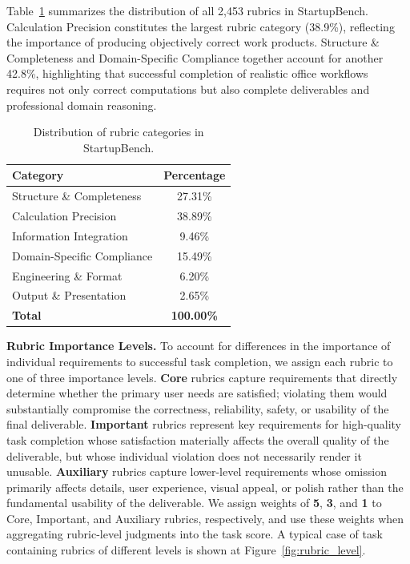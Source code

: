 Table~\ref{tab:rubric_distribution} summarizes the distribution of all 2,453 rubrics in StartupBench.  Calculation Precision constitutes the largest rubric category (38.9\%), reflecting the importance of producing objectively correct work products. Structure \& Completeness and Domain-Specific Compliance together account for another 42.8\%, highlighting that successful completion of realistic office workflows requires not only correct computations but also complete deliverables and professional domain reasoning.

\begin{table}[h]
\centering
\small
\caption{Distribution of rubric categories in StartupBench.}
\label{tab:rubric_distribution}
\begin{tabular}{lc}
\toprule
\textbf{Category} & \textbf{Percentage} \\
\midrule
Structure \& Completeness & 27.31\% \\
Calculation Precision & 38.89\% \\
Information Integration & 9.46\% \\
Domain-Specific Compliance & 15.49\% \\
Engineering \& Format & 6.20\% \\
Output \& Presentation & 2.65\% \\
\midrule
\textbf{Total} & \textbf{100.00\%} \\
\bottomrule
\end{tabular}
\end{table}



\textbf{Rubric Importance Levels.} To account for differences in the importance of individual requirements to successful task completion, we assign each rubric to one of three importance levels. \textbf{Core} rubrics capture requirements that directly determine whether the primary user needs are satisfied; violating them would substantially compromise the correctness, reliability, safety, or usability of the final deliverable. \textbf{Important} rubrics represent key requirements for high-quality task completion whose satisfaction materially affects the overall quality of the deliverable, but whose individual violation does not necessarily render it unusable. \textbf{Auxiliary} rubrics capture lower-level requirements whose omission primarily affects details, user experience, visual appeal, or polish rather than the fundamental usability of the deliverable. We assign weights of \textbf{5}, \textbf{3}, and \textbf{1} to Core, Important, and Auxiliary rubrics, respectively, and use these weights when aggregating rubric-level judgments into the task score. A typical case of task containing rubrics of different levels is shown at Figure~\ref{fig:rubric_level}.

